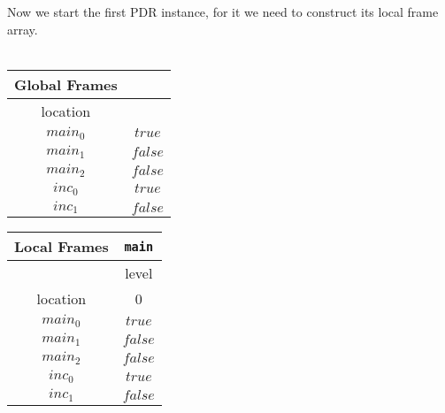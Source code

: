 \documentclass{article}
\begin{document}
	Now we start the first PDR instance, for it we need to construct its local frame array. \\ \\
	\begin{minipage}{.5\textwidth}
		\setlength\tabcolsep{0.35em}
		\begin{center}
			\begin{tabu}{cc}
				Global Frames \\
				\toprule
				location & \\
				$main_0$ & $true$ \\
				$main_1$ & $false$ \\
				$main_2$ & $false$ \\
				$inc_0$ & $true$ \\
				$inc_1$ & $false$\\
				\bottomrule
			\end{tabu}
		\end{center}
	\end{minipage}
	\hfill
	\begin{minipage}{.4\textwidth}
	\setlength\tabcolsep{0.35em}
		\begin{center}
			\begin{tabu}{cc}
				Local Frames & \texttt{main} \\
				\toprule
				& level \\
				\cmidrule(lr){2-2}
				location & 0 \\
				\cmidrule{1-2}
				$main_0$ & $true$ \\
				$main_1$ & $false$ \\
				$main_2$ & $false$ \\
				$inc_0$ & $true$ \\
				$inc_1$ & $false$\\
				\bottomrule
			\end{tabu}
		\end{center}	
	\end{minipage}
	
\end{document}
